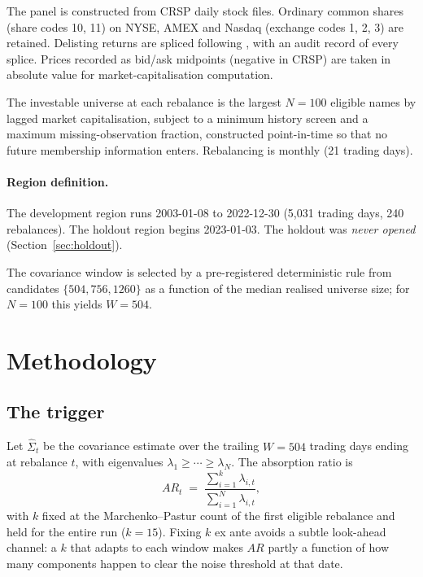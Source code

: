 \documentclass[12pt,letterpaper]{article}
\begin{document}
The panel is constructed from CRSP daily stock files. Ordinary common shares (share
codes 10, 11) on NYSE, AMEX and Nasdaq (exchange codes 1, 2, 3) are retained.
Delisting returns are spliced following \citet{shumway1997}, with an audit record of
every splice. Prices recorded as bid/ask midpoints (negative in CRSP) are taken in
absolute value for market-capitalisation computation.

The investable universe at each rebalance is the largest $N = 100$ eligible names by
lagged market capitalisation, subject to a minimum history screen and a maximum
missing-observation fraction, constructed point-in-time so that no future membership
information enters. Rebalancing is monthly (21 trading days).

\paragraph{Region definition.} The development region runs 2003-01-08 to 2022-12-30
(5{,}031 trading days, 240 rebalances). The holdout region begins 2023-01-03. The
holdout was \emph{never opened} (Section~\ref{sec:holdout}).

The covariance window is selected by a pre-registered deterministic rule from
candidates $\{504, 756, 1260\}$ as a function of the median realised universe size;
for $N = 100$ this yields $W = 504$.

\section{Methodology}

\subsection{The trigger}
\label{sec:trigger}

Let $\hat{\Sigma}_t$ be the covariance estimate over the trailing $W = 504$ trading
days ending at rebalance $t$, with eigenvalues
$\lambda_1 \geq \cdots \geq \lambda_N$. The absorption ratio is
\begin{equation}
AR_t \;=\; \frac{\sum_{i=1}^{k} \lambda_{i,t}}{\sum_{i=1}^{N} \lambda_{i,t}},
\label{eq:ar}
\end{equation}
with $k$ fixed at the Marchenko--Pastur count of the first eligible rebalance and
held for the entire run ($k = 15$). Fixing $k$ ex ante avoids a subtle look-ahead
channel: a $k$ that adapts to each window makes $AR$ partly a function of how many
components happen to clear the noise threshold at that date.
\end{document}
